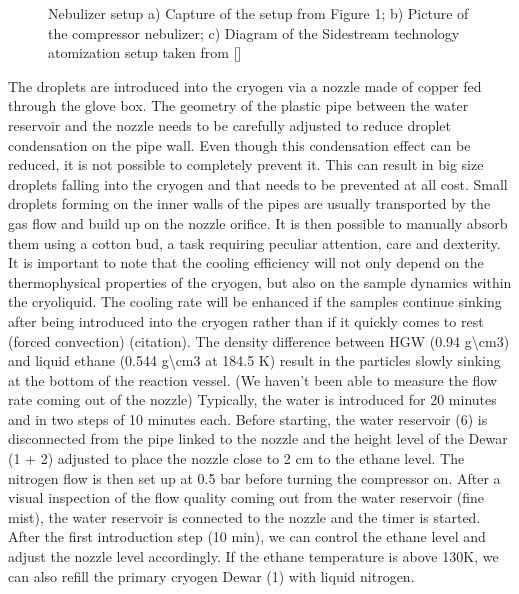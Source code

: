 \documentclass[letterpaper,10pt,english]{jupyterBook}
\begin{document}
\begin{figure}[htbp]
\centering
\capstart

\noindent{}
\caption{Nebulizer setup a) Capture of the setup from Figure 1; b) Picture of the compressor nebulizer; c) Diagram of the Sidestream technology atomization setup taken from {[}{]}}\label{\detokenize{Chapter6/Chapter6:gb-fig3}}\end{figure}

\sphinxAtStartPar
The droplets are introduced into the cryogen via a nozzle made of copper fed through the glove box. The geometry of the plastic pipe between the water reservoir and the nozzle needs to be carefully adjusted to reduce droplet condensation on the pipe wall. Even though this condensation effect can be reduced, it is not possible to completely prevent it. This can result in big size droplets falling into the cryogen and that needs to be prevented at all cost. Small droplets forming on the inner walls of the pipes are usually transported by the gas flow and build up on the nozzle orifice. It is then possible to manually absorb them using a cotton bud, a task requiring peculiar attention, care and dexterity.
It is important to note that the cooling efficiency will not only depend on the thermophysical properties of the cryogen, but also on the sample dynamics within the cryoliquid. The cooling rate will be enhanced if the samples continue sinking after being introduced into the cryogen rather than if it quickly comes to rest (forced convection) (citation). The density difference between HGW (0.94 g\textbackslash{}cm3) and liquid ethane (0.544 g\textbackslash{}cm3 at 184.5 K) result in the particles slowly sinking at the bottom of the reaction vessel. (We haven’t been able to measure the flow rate coming out of the nozzle)
Typically, the water is introduced for 20 minutes and in two steps of 10 minutes each. Before starting, the water reservoir (6) is disconnected from the pipe linked to the nozzle and the height level of the Dewar (1 + 2) adjusted to place the nozzle close to 2 cm to the ethane level. The nitrogen flow is then set up at 0.5 bar before turning the compressor on. After a visual inspection of the flow quality coming out from the water reservoir (fine mist), the water reservoir is connected to the nozzle and the timer is started. After the first introduction step (10 min), we can control the ethane level and adjust the nozzle level accordingly. If the ethane temperature is above 130K, we can also refill the primary cryogen Dewar (1) with liquid nitrogen.
\end{document}

